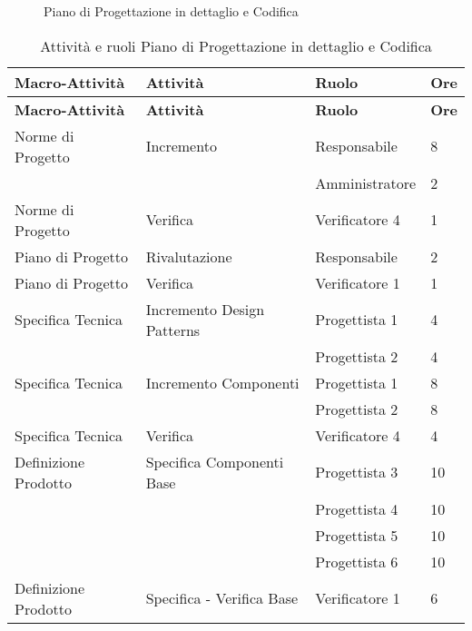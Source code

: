 {{	\begin{landscape}
		\thispagestyle{empty}
		\begin{figure}[H]
			\parbox[c][\textwidth][s]{\linewidth}{
			\centering
			\vspace*{\fill}
			\vspace*{\fill}
			\label{fig:pianoprogettazdettcodifica}
			\caption{Piano di Progettazione in dettaglio e Codifica}}
		\end{figure}
	\end{landscape}
	
	\renewcommand*{\arraystretch}{1.4}
	\begin{longtable} [c]{| l | l | l | l |}
		\caption{Attività e ruoli Piano di Progettazione in dettaglio e Codifica \label{tab:pianoprogettazdettcodifica}}\\
		 \hline
		 \textbf{Macro-Attività} & \textbf{Attività} & \textbf{Ruolo} & \textbf{Ore}\\
		 \hline
		 \endfirsthead
		 \hline
		 \textbf{Macro-Attività} & \textbf{Attività} & \textbf{Ruolo} & \textbf{Ore}\\
		 \hline
				\endhead
		 \hline
		 \endfoot
		 \hline
		 \endlastfoot
		 Norme di Progetto\ped{g} & Incremento & Responsabile & 8\\
		 &	&	Amministratore & 2\\
		 Norme di Progetto\ped{g} & Verifica & Verificatore 4 & 1 \\
		 Piano di Progetto\ped{g} & Rivalutazione & Responsabile & 2 \\
		 Piano di Progetto\ped{g} & Verifica & Verificatore 1 & 1 \\
		 Specifica Tecnica & Incremento Design Patterns & Progettista 1 & 4\\
		 &	&	Progettista 2 & 4\\
		 Specifica Tecnica & Incremento Componenti & Progettista 1 & 8\\
		 &	&	Progettista 2 & 8\\
		 Specifica Tecnica & Verifica & Verificatore 4 & 4 \\
		 Definizione Prodotto & Specifica Componenti Base & Progettista 3 & 10\\
		 &	&	Progettista 4 & 10\\
		 &	&	Progettista 5 & 10\\
		 &	&	Progettista 6 & 10\\
		 Definizione Prodotto & Specifica - Verifica Base & Verificatore 1 & 6\\

\end{longtable}}}
